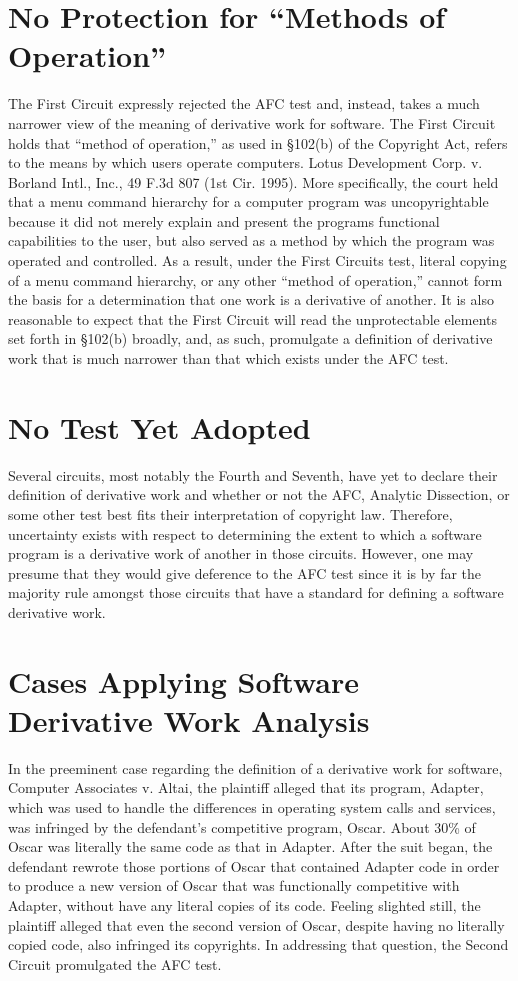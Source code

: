 \documentclass[11pt, letterpaper]{book}
\begin{document}
\section{No Protection for ``Methods of Operation''}

The First Circuit expressly rejected the AFC test and, instead, takes a
much narrower view of the meaning of derivative work for software. The
First Circuit holds that ``method of operation,'' as used in \S 102(b) of
the Copyright Act, refers to the means by which users operate
computers. Lotus Development Corp. v. Borland Intl., Inc., 49 F.3d 807
(1st Cir. 1995). More specifically, the court held that a menu command
hierarchy for a computer program was uncopyrightable because it did not
merely explain and present the programs functional capabilities to the
user, but also served as a method by which the program was operated and
controlled. As a result, under the First Circuits test, literal copying
of a menu command hierarchy, or any other ``method of operation,'' cannot
form the basis for a determination that one work is a derivative of
another. It is also reasonable to expect that the First Circuit will read
the unprotectable elements set forth in \S 102(b) broadly, and, as such,
promulgate a definition of derivative work that is much narrower than that
which exists under the AFC test.

\section{No Test Yet Adopted}

Several circuits, most notably the Fourth and Seventh, have yet to
declare their definition of derivative work and whether or not the
AFC, Analytic Dissection, or some other test best fits their
interpretation of copyright law. Therefore, uncertainty exists with
respect to determining the extent to which a software program is a
derivative work of another in those circuits. However, one may presume
that they would give deference to the AFC test since it is by far the
majority rule amongst those circuits that have a standard for defining
a software derivative work.

\section{Cases Applying Software Derivative Work Analysis}

In the preeminent case regarding the definition of a derivative work for
software, Computer Associates v. Altai, the plaintiff alleged that its
program, Adapter, which was used to handle the differences in operating
system calls and services, was infringed by the defendant's competitive
program, Oscar. About 30\% of Oscar was literally the same code as
that in Adapter. After the suit began, the defendant rewrote those
portions of Oscar that contained Adapter code in order to produce a new
version of Oscar that was functionally competitive with Adapter, without
have any literal copies of its code. Feeling slighted still, the
plaintiff alleged that even the second version of Oscar, despite having no
literally copied code, also infringed its copyrights. In addressing that
question, the Second Circuit promulgated the AFC test.
\end{document}
